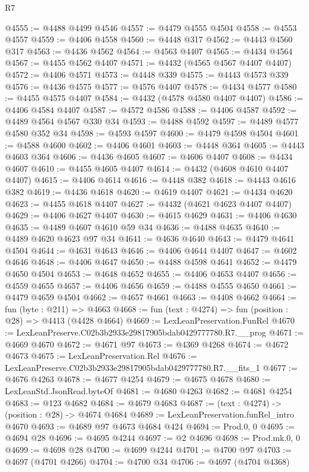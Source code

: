\begin{lexlean}{R7}
\begin{coremodule}
@4555 := @4488 @4499 @4546
@4557 := @4479 @4555 @4504
@4558 := @4553 @4557
@4559 := @4406 @4558
@4560 := @4448 @317
@4562 := @4443 @4560 @317
@4563 := @4436 @4562
@4564 := @4563 @4407
@4565 := @4434 @4564
@4567 := @4455 @4562 @4407
@4571 := @4432 (@4565 @4567 @4407 @4407)
@4572 := @4406 @4571
@4573 := @4448 @339
@4575 := @4443 @4573 @339
@4576 := @4436 @4575
@4577 := @4576 @4407
@4578 := @4434 @4577
@4580 := @4455 @4575 @4407
@4584 := @4432 (@4578 @4580 @4407 @4407)
@4586 := @4406 @4584 @4407
@4587 := @4572 @4586
@4588 := @4406 @4587
@4592 := @4489 @4564 @4567 @330 @34
@4593 := @4488 @4592
@4597 := @4489 @4577 @4580 @352 @34
@4598 := @4593 @4597
@4600 := @4479 @4598 @4504
@4601 := @4588 @4600
@4602 := @4406 @4601
@4603 := @4448 @364
@4605 := @4443 @4603 @364
@4606 := @4436 @4605
@4607 := @4606 @4407
@4608 := @4434 @4607
@4610 := @4455 @4605 @4407
@4614 := @4432 (@4608 @4610 @4407 @4407)
@4615 := @4406 @4614
@4616 := @4448 @382
@4618 := @4443 @4616 @382
@4619 := @4436 @4618
@4620 := @4619 @4407
@4621 := @4434 @4620
@4623 := @4455 @4618 @4407
@4627 := @4432 (@4621 @4623 @4407 @4407)
@4629 := @4406 @4627 @4407
@4630 := @4615 @4629
@4631 := @4406 @4630
@4635 := @4489 @4607 @4610 @59 @34
@4636 := @4488 @4635
@4640 := @4489 @4620 @4623 @97 @34
@4641 := @4636 @4640
@4643 := @4479 @4641 @4504
@4644 := @4631 @4643
@4646 := @4406 @4644 @4407
@4647 := @4602 @4646
@4648 := @4406 @4647
@4650 := @4488 @4598 @4641
@4652 := @4479 @4650 @4504
@4653 := @4648 @4652
@4655 := @4406 @4653 @4407
@4656 := @4559 @4655
@4657 := @4406 @4656
@4659 := @4488 @4555 @4650
@4661 := @4479 @4659 @4504
@4662 := @4657 @4661
@4663 := @4408 @4662
@4664 := fun (byte : @211) => @4663
@4668 := fun (text : @4274) => fun (position : @28) => @4413 (@4428 @4664)
@4669 := LexLeanPreservation.FunRel
@4670 := LexLeanPreserve.C02b3b2933e29817905bdab0429777780.R7.__prog
@4671 := @4669 @4670
@4672 := @4671 @97
@4673 := @4369 @4268
@4674 := @4672 @4673
@4675 := LexLeanPreservation.Rel
@4676 := LexLeanPreserve.C02b3b2933e29817905bdab0429777780.R7.__fits_1
@4677 := @4676 @4263
@4678 := @4677 @4254
@4679 := @4675 @4678
@4680 := LexLeanStd.JsonRead.byteOf
@4681 := @4680 @4263
@4682 := @4681 @4254
@4683 := @123 @4682
@4684 := @4679 @4683
@4687 := (text : @4274) -> (position : @28) -> @4674 @4684
@4689 := LexLeanPreservation.funRel_intro @4670
@4693 := @4689 @97 @4673 @4684 @424
@4694 := Prod.{0, 0}
@4695 := @4694 @28
@4696 := @4695 @4244
@4697 := @2 @4696
@4698 := Prod.mk.{0, 0}
@4699 := @4698 @28
@4700 := @4699 @4244
@4701 := @4700 @97
@4703 := @4697 (@4701 @4266)
@4704 := @4700 @34
@4706 := @4697 (@4704 @4368)

\end{coremodule}
\end{lexlean}

